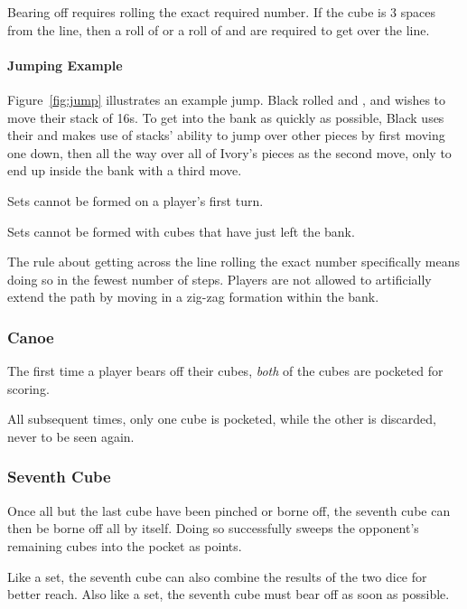 Bearing off requires rolling the exact required number. If the cube is 3 spaces from the line, then a roll of  or a roll of  and  are required to get over the line.

\paragraph{Jumping Example}
Figure~\ref{fig:jump} illustrates an example jump.
Black rolled  and , and wishes to move their stack of 16s.
To get into the bank as quickly as possible, Black uses their  and makes use of stacks' ability to jump over other pieces by first moving one down, then all the way over all of Ivory's pieces as the second move, only to end up inside the bank with a third move.

\note Sets cannot be formed on a player's first turn.

\note Sets cannot be formed with cubes that have just left the bank.

\note The rule about getting across the line rolling the exact number specifically means doing so in the fewest number of steps. Players are not allowed to artificially extend the path by moving in a zig-zag formation within the bank.

\subsubsection{Canoe}
The first time a player bears off their cubes, \textit{both} of the cubes are pocketed for scoring.

All subsequent times, only one cube is pocketed, while the other is discarded, never to be seen again.

\subsubsection{Seventh Cube}
Once all but the last cube have been pinched or borne off, the seventh cube can then be borne off all by itself.
Doing so successfully sweeps the opponent's remaining cubes into the pocket as points.

Like a set, the seventh cube can also combine the results of the two dice for better reach.
Also like a set, the seventh cube must bear off as soon as possible.